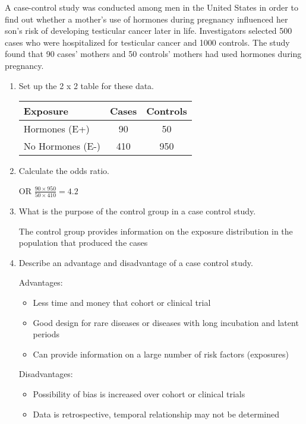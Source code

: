 
A case-control study was conducted among men in the United States in order to find out whether a mother's use of hormones during pregnancy influenced her son's risk of developing testicular cancer later in life.  Investigators selected 500 cases who were hospitalized for testicular cancer and 1000 controls.  The study found that 90 cases' mothers and 50 controls' mothers had used hormones during pregnancy.

\begin{enumerate}	
\item Set up the 2 x 2 table for these data.

\answerSpace{3cm}

\begin{AnswerText}
\begin{tabular}{l|cc}
Exposure &	Cases& Controls\\\hline
Hormones (E+) &	90 &	50\\
No Hormones (E-) &	410 &	950\\
\end{tabular}
\end{AnswerText}

       
\item Calculate the odds ratio.
\answerSpace{2cm}

\begin{AnswerText}
 OR  $\frac{90 \times 950}{50\times 410}  =  4.2$
\end{AnswerText}

\item What is the purpose of the control group in a case control study.
\answerSpace{2cm}

\begin{AnswerText}
 The control group provides information on the exposure distribution in the population that produced the cases 
\end{AnswerText}

\item Describe an advantage and disadvantage of a case control study.
\answerSpace{3cm}
      
\begin{AnswerText}
\noindent  Advantages:
\begin{itemize}  
\item              Less time and money that cohort or clinical trial 
\item              Good design for rare diseases or diseases with long incubation and latent periods
\item              Can provide information on a large number of risk factors (exposures)
\end{itemize}


\noindent Disadvantages:
\begin{itemize}
\item        Possibility of bias is increased over cohort or clinical trials
\item         Data is retrospective, temporal relationship may not be determined
\end{itemize}

\end{AnswerText}

\end{enumerate}
